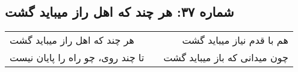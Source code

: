 \begin{center}
\section*{شماره ۳۷: هر چند که اهل راز میباید گشت}
\label{sec:037}
\begin{longtable}{l p{0.5cm} r}
هر چند که اهل راز میباید گشت
&&
هم با قدم نیاز میباید گشت
\\
تا چند روی، چو راه را پایان نیست
&&
چون میدانی که باز میباید گشت
\\
\end{longtable}
\end{center}
